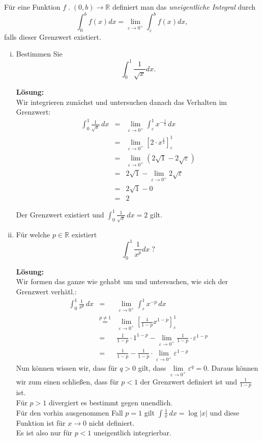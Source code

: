 \documentclass[11pt,a4paper,ngerman]{article}
\begin{document}
Für eine Funktion $f \; . \; (0,b) \rightarrow \mathbb{R}$ definiert man das \emph{uneigentliche Integral} durch
$$
\int_0^b f(x)dx = \lim_{\varepsilon \rightarrow 0^+} \int _\varepsilon^b f(x)dx,
$$
falls dieser Grenzwert existiert.
\begin{enumerate}[(i)]
	\item Bestimmen Sie
		$$
			\int_0^1 \frac{1}{\sqrt{x}} dx.
		$$

		\textbf{Lösung:}\\
		Wir integrieren zunächst und untersuchen danach das Verhalten im Grenzwert:
		$$\begin{array}{rcl}
			\int_0^1 \frac{1}{\sqrt{x}} \, dx &=& \underset{\varepsilon \rightarrow 0^+}{\lim} \int_\varepsilon^1 x^{-\frac{1}{2}} \, dx\\
				&=&\underset{\varepsilon \rightarrow 0^+}{\lim} \left[ 2 \cdot x^{\frac{1}{2}} \right]_\varepsilon^1\\
				&=& \underset{\varepsilon \rightarrow 0^+}{\lim} (2\sqrt{1} - 2\sqrt{\varepsilon})\\
				&=& 2 \sqrt{1} - \underset{\varepsilon \rightarrow 0^+}{\lim} 2 \sqrt{\varepsilon}\\
				&=& 2 \sqrt{1} - 0\\
				&=& 2
		\end{array}$$

		Der Grenzwert existiert und $\int_0^1 \frac{1}{\sqrt{x}} \, dx= 2$ gilt.
	\item Für welche $p \in \mathbb{R}$ existiert
		$$
			\int_0^1 \frac{1}{x^p}dx \; ?
		$$

		\textbf{Lösung:}\\
		Wir formen das ganze wie gehabt um und untersuchen, wie sich der Grenzwert verhätl.:
		$$\begin{array}{rcl}
			\int_0^1 \frac{1}{x^p} \, dx &=& \underset{\varepsilon \rightarrow 0^+}{\lim} \int_\varepsilon^1 x^{-p} \, dx\\
				&\stackrel{p\not=1}{=}& \underset{\varepsilon \rightarrow 0^+}{\lim} \left[ \frac{1}{1-p} x^{1-p}\right]_\varepsilon^1\\
				&=& \frac{1}{1-p}\cdot 1^{1-p} - \underset{\varepsilon \rightarrow 0^+}{\lim} \frac{1}{1-p} \cdot \varepsilon^{1-p} \\
                &=& \frac{1}{1-p} - \frac{1}{1-p} \cdot \underset{\varepsilon \rightarrow 0^+}{\lim} \varepsilon^{1-p} 
		\end{array}$$
		Nun können wissen wir, dass für $q>0$ gilt, dass $\underset{\varepsilon \rightarrow 0^+}{\lim} \varepsilon^q = 0$.
		Daraus können wir zum einen schließen, dass für $p<1$ der Grenzwert definiert ist und $\frac{1}{1-p}$ ist.\\
		Für $p>1$ divergiert es bestimmt gegen unendlich.\\
		Für den vorhin ausgenommen Fall $p=1$ gilt $\int \frac{1}{x} \, dx = \log |x|$ und diese Funktion ist für $x \rightarrow 0$ nicht definiert.\\
		Es ist also nur für $p<1$ uneigentlich integrierbar.
\end{enumerate}
\end{document}
